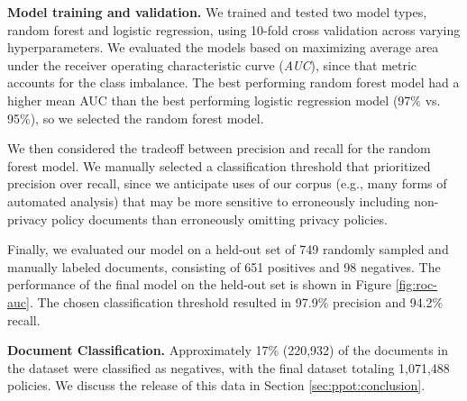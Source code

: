 \textbf{Model training and validation.}
We trained and tested two model types, random forest and logistic regression, using 10-fold cross validation across varying hyperparameters. We evaluated the models based on maximizing average area under the receiver operating characteristic curve (\textit{AUC}), since that metric accounts for the class imbalance. The best performing random forest model had a higher mean AUC than the best performing logistic regression model (97\% vs. 95\%), so we selected the random forest model.

We then considered the tradeoff between precision and recall for the random forest model. We manually selected a classification threshold that prioritized precision over recall, since we anticipate uses of our corpus (e.g., many forms of automated analysis) that may be more sensitive to erroneously including non-privacy policy documents than erroneously omitting privacy policies.

Finally, we evaluated our model on a held-out set of 749 randomly sampled and manually labeled documents, consisting of 651 positives and 98 negatives. The performance of the final model on the held-out set is shown in Figure \ref{fig:roc-auc}. The chosen classification threshold resulted in 97.9\% precision and 94.2\% recall.

\textbf{Document Classification.}
Approximately 17\% (220,932) of the documents in the dataset were classified as negatives, with the final dataset totaling 1,071,488 policies. We discuss the release of this data in Section \ref{sec:ppot:conclusion}.

